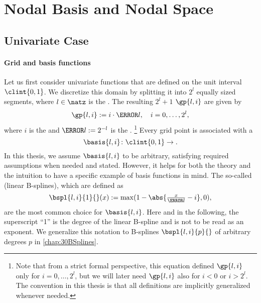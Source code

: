 \section{Nodal Basis and Nodal Space}
\label{sec:21nodalSpaces}



\subsection{Univariate Case}
\label{sec:211nodalUV}

\paragraph{Grid and basis functions}

Let us first consider univariate functions
that are defined on the unit interval $\clint{0, 1}$.
We discretize this domain by splitting it into $2^l$ equally sized segments,
where $l \in \natz$ is the .
The resulting $2^l + 1$  $\gp{l,i}$ are given by
\begin{equation}
  \gp{l,i} := i \cdot \ms{l},\quad
  i = 0, \dotsc, 2^l,
\end{equation}
where $i$ is the  and $\ms{l} := 2^{-l}$ is the .%
\footnote{%
  Note that from a strict formal perspective,
  this equation defined $\gp{l,i}$ only for $i = 0, \dotsc, 2^l$,
  but we will later need $\gp{l,i}$ also for $i < 0$ or $i > 2^l$.
  The convention in this thesis is that all definitions are
  implicitly generalized whenever needed.%
}
Every grid point is associated with a 
\begin{equation}
  \basis{l,i}\colon \clint{0, 1} \to \real.
\end{equation}
In this thesis, we assume $\basis{l,i}$ to be arbitrary,
satisfying required assumptions when needed and stated.
However, it helps for both the theory and the intuition to have a
specific example of basis functions in mind.
The so-called  (linear B-splines), which are defined as
\begin{equation}
  \label{eq:hatFunctionUV}
  \bspl{l,i}{1}{}(x)
  := \max(1 - \abs{\tfrac{x}{\ms{l}} - i}, 0),
\end{equation}
are the most common choice for $\basis{l,i}$.
Here and in the following,
the superscript ``1'' is the degree of the linear B-spline and
is not to be read as an exponent.
We generalize this notation to B-splines $\bspl{l,i}{p}{}$ of
arbitrary degrees $p$ in \cref{chap:30BSplines}.

